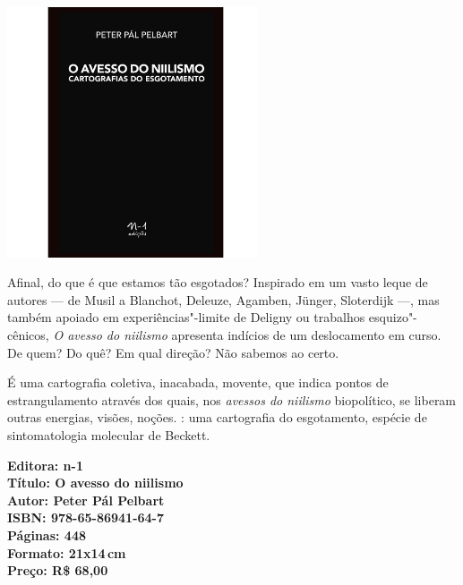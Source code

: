 \pagebreak

\begin{center}
\hspace*{.5cm}\includegraphics[width=74mm]{./CAPAS/N-1_PELBART.jpg}
\end{center}

\hspace*{-7cm}\hrulefill\hspace*{-7cm}

\medskip

\noindent{}Afinal, do que é que estamos tão esgotados? Inspirado em um vasto leque de autores --- de Musil a Blanchot, Deleuze, Agamben, Jünger, Sloterdijk ---, mas também apoiado em experiências"-limite de Deligny ou trabalhos esquizo"-cênicos, \textit{O avesso do niilismo} apresenta indícios de um deslocamento em curso. De quem? Do quê? Em qual direção? Não sabemos ao certo. 

É uma cartografia coletiva, inacabada, movente, que indica pontos de estrangulamento através dos quais, nos \textit{avessos do niilismo} biopolítico, se liberam outras energias, visões, noções. : uma cartografia do esgotamento, espécie de sintomatologia molecular de Beckett.

\vfill

\hspace*{-.4cm}\begin{minipage}[c]{1\linewidth}
\small\textbf{
\hspace*{-.1cm}Editora: n-1\\
Título: O avesso do niilismo\\
Autor: Peter Pál Pelbart\\
ISBN: 978-65-86941-64-7\\
Páginas: 448\\
Formato: 21x14\,cm\\
Preço: R\$ 68,00\\
}
\end{minipage}

